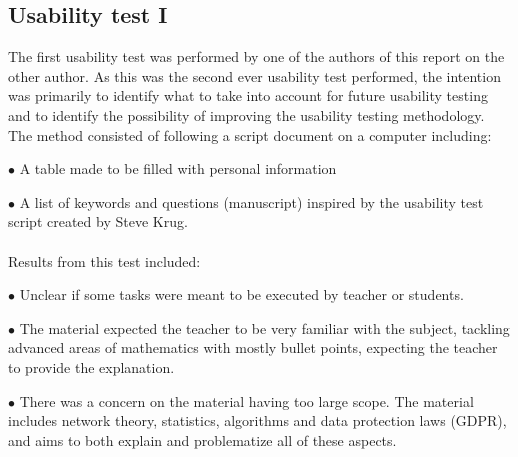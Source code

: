 \subsection{Usability test I}
The first usability test was performed by one of the authors of this report on the other author. As this was the second ever usability test performed, the intention was primarily to identify what to take into account for future usability testing and to identify the possibility of improving the usability testing methodology. The method consisted of following a script document on a computer including:
\begin{description}
    \item $\bullet$ A table made to be filled with personal information
    \item $\bullet$ A list of keywords and questions (manuscript) inspired by the usability test script created by Steve Krug.
\end{description}

\paragraph*{}
Results from this test included:
\begin{description}
    \item $\bullet$ Unclear if some tasks were meant to be executed by teacher or students.
    \item $\bullet$ The material expected the teacher to be very familiar with the subject, tackling advanced areas of mathematics with mostly bullet points, expecting the teacher to provide the explanation.
    \item $\bullet$ There was a concern on the material having too large scope. The material includes network theory, statistics, algorithms and data protection laws (GDPR), and aims to both explain and problematize all of these aspects.
\end{description}
